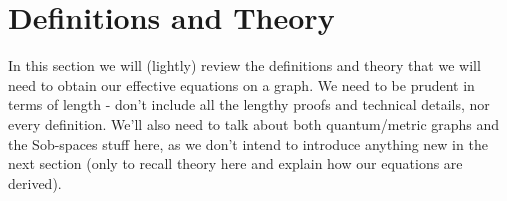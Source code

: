 \section{Definitions and Theory} \label{sec:DefsAndTheory}

In this section we will (lightly) review the definitions and theory that we will need to obtain our effective equations on a graph.
We need to be prudent in terms of length - don't include all the lengthy proofs and technical details, nor every definition.
We'll also need to talk about both quantum/metric graphs and the Sob-spaces stuff here, as we don't intend to introduce anything new in the next section (only to recall theory here and explain how our equations are derived).